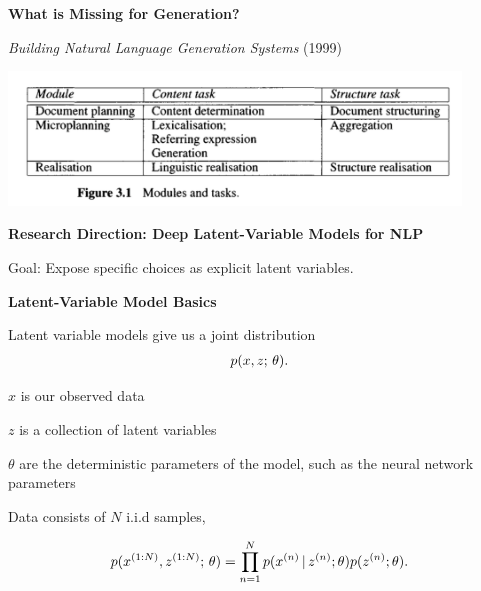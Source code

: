 \documentclass[aspectratio=169]{beamer}
\let\tempone\itemize
\let\temptwo\enditemize
\renewenvironment{itemize}{\tempone\addtolength{\itemsep}{0.5\baselineskip}}{\temptwo}
\begin{document}
\begin{frame}
  \begin{center}
    \textbf{ What is Missing for  Generation? }
  \end{center}

    \textit{Building Natural Language Generation Systems} (1999)
  
\vspace*{-1cm}
 \begin{center}
    \includegraphics[width =12cm]{datadoc}
  \end{center}
  \vspace*{-0.5cm}
\end{frame}

\begin{frame}
\begin{center}
    \textbf{Research Direction: Deep Latent-Variable Models for NLP }
  \end{center}
  Goal: Expose specific choices as explicit latent variables.   
  
\end{frame}

\begin{frame}
\begin{center}
    \textbf{ Latent-Variable Model Basics }
  \end{center}
  
Latent variable models give us a joint distribution
\begin{align*}
p(x, z ; \, \theta).
\end{align*}

\pause
\begin{itemize}
    \item $x$ is our observed data
    \item $z$ is a collection of latent variables
    \item $\theta$ are the deterministic parameters of the model, such as the neural network parameters
\end{itemize}

\pause

\begin{itemize}
    \item Data consists of $N$ i.i.d samples,
\end{itemize}


                \[ p(x^{(1:N)}, z^{(1:N)} ; \, \theta ) = \prod_{n=1}^N p(x^{(n)} \,|\, z^{(n)}; \theta) p(z^{(n)};\theta). \]
\end{frame}
\end{document}
